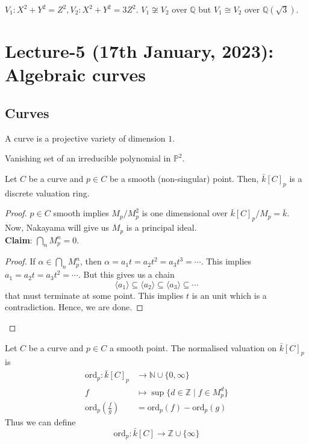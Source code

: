 \documentclass[oneside, 12pt]{scrbook}
\newcommand{\NN}{\mathbb N}
\newcommand{\QQ}{\mathbb Q}
\newcommand{\ZZ}{\mathbb Z}
\newcommand{\PP}{\mathbb{P}}
\theoremstyle{theorem}
\begin{document}
\begin{example}
$V_{1}: X^2 + Y^2 = Z^2 , V_{2}: X^2 + Y^2 = 3Z^2$. $V_{1} \not \cong V_{2}$ over $\QQ$ but $V_{1}\cong V_{2}$ over $\QQ(\sqrt{3})$.
\end{example}

\chapter{Lecture-5 (17th January, 2023): Algebraic curves}

\section{Curves}

\begin{definition}
A curve is a projective variety of dimension $1$.
\end{definition}

\begin{example}
Vanishing set of an irreducible polynomial in $\PP^2$.
\end{example}

\begin{proposition}
Let $C$ be a curve and $p \in C$ be a smooth (non-singular) point. Then, $\bar{k}[C]_{p}$ is a discrete valuation ring.
\end{proposition}

\begin{proof}
$p \in C$ smooth implies $M_{p}/M_{p}^2$ is one dimensional over $\bar{k}[C]_{p}/M_{p} = \bar{k}$. Now, Nakayama will give us $M_{p}$ is a principal ideal. \\

\textbf{Claim}:
$\bigcap_{n} M_{p}^n = 0$.

\begin{proof}
If $\alpha \in \bigcap_{n} M_{p}^n$, then $\alpha = a_{1}t = a_{2} t^2 = a_{3} t^3 = \cdots $. This implies $a_{1} = a_{2}t = a_{3}t^2 = \cdots $. But this gives us a chain $$\langle a_{1} \rangle \subseteq \langle a_{2} \rangle \subseteq \langle a_{3} \rangle \subseteq \cdots $$ that must terminate at some point. This implies $t$ is an unit which is a contradiction. Hence, we are done.
\end{proof}
\end{proof}

\begin{definition}
Let $C$ be a curve and $p \in C$ a smooth point. The normalised valuation on $\bar{k}[C]_{p}$ is 
\begin{align*}
\mathrm{ord}_{p}: \bar{k}[C]_{p} &\rightarrow \NN \cup \{0, \infty\} \\
f &\mapsto \sup \{d \in \ZZ \mid f \in M_{p}^d \} \\
\mathrm{ord}_{p}(\frac{f}{g}) &= \mathrm{ord}_{p}(f) - \mathrm{ord}_{p}(g)
\end{align*}
Thus we can define $$\mathrm{ord}_{p} : \bar{k}[C] \rightarrow \ZZ \cup \{\infty\}$$
\end{definition}
\end{document}
